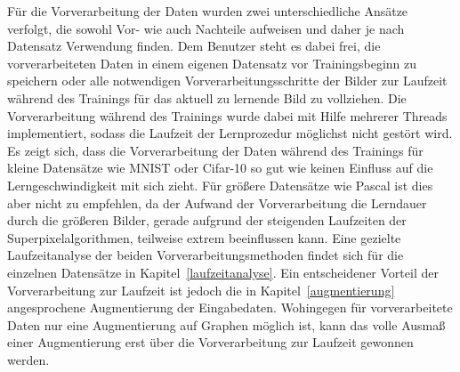 Für die Vorverarbeitung der Daten wurden zwei unterschiedliche Ansätze verfolgt, die sowohl Vor- wie auch Nachteile aufweisen und daher je nach Datensatz Verwendung finden.
Dem Benutzer steht es dabei frei, die vorverarbeiteten Daten in einem eigenen Datensatz vor Trainingsbeginn zu speichern oder alle notwendigen Vorverarbeitungsschritte der Bilder zur Laufzeit während des Trainings für das aktuell zu lernende Bild zu vollziehen.
Die Vorverarbeitung während des Trainings wurde dabei mit Hilfe mehrerer Threads implementiert, sodass die Laufzeit der Lernprozedur möglichst nicht gestört wird.
Es zeigt sich, dass die Vorverarbeitung der Daten während des Trainings für kleine Datensätze wie \gls{MNIST} oder \gls{Cifar}-10 so gut wie keinen Einfluss auf die Lerngeschwindigkeit mit sich zieht.
Für größere Datensätze wie \gls{Pascal} ist dies aber nicht zu empfehlen, da der Aufwand der Vorverarbeitung die Lerndauer durch die größeren Bilder, gerade aufgrund der steigenden Laufzeiten der Superpixelalgorithmen, teilweise extrem beeinflussen kann.
Eine gezielte Laufzeitanalyse der beiden Vorverarbeitungsmethoden findet sich für die einzelnen Datensätze in Kapitel~\ref{laufzeitanalyse}.
Ein entscheidener Vorteil der Vorverarbeitung zur Laufzeit ist jedoch die in Kapitel~\ref{augmentierung} angesprochene Augmentierung der Eingabedaten.
Wohingegen für vorverarbeitete Daten nur eine Augmentierung auf Graphen möglich ist, kann das volle Ausmaß einer Augmentierung erst über die Vorverarbeitung zur Laufzeit gewonnen werden.
